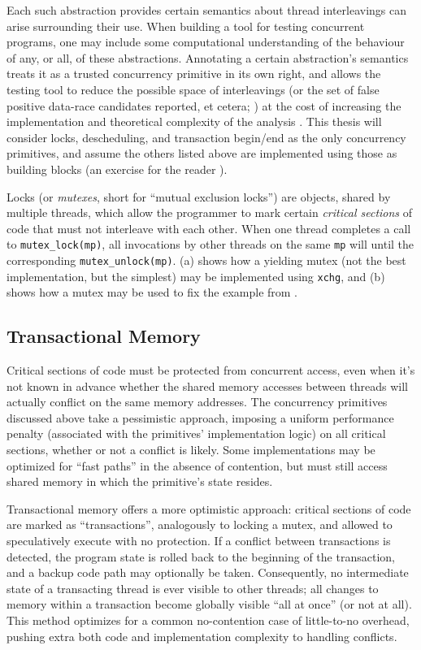Each such abstraction provides certain semantics about  thread interleavings can arise surrounding their use.
When building a tool for testing concurrent programs,
one may include some computational understanding of the behaviour of any, or all, of these abstractions.
Annotating a certain abstraction's semantics treats it as a trusted concurrency primitive in its own right,
and allows the testing tool to reduce the possible space of interleavings
(or the set of false positive data-race candidates reported, et cetera;
)
at the cost of increasing the implementation and theoretical complexity of the analysis
.
This thesis will consider locks, descheduling, and transaction begin/end as the only concurrency primitives,
and assume the others listed above are implemented using those as building blocks (an exercise for the reader \cite{thrlib}).

Locks (or {\em mutexes}, short for ``mutual exclusion locks'') are objects, shared by multiple threads, which allow the programmer to mark certain {\em critical sections} of code that must not interleave with each other.
When one thread completes a call to {\tt mutex\_lock(mp)}, all invocations by other threads on the same {\tt mp}
will  until the corresponding {\tt mutex\_unlock(mp)}.
(a) shows how a yielding mutex (not the best implementation, but the simplest) may be implemented using {\tt xchg},
and (b) shows how a mutex may be used to fix the example from .


\subsection{Transactional Memory}
\label{sec:overview-tm}

Critical sections of code must be protected from concurrent access, even when it's not known in advance whether the shared memory accesses between threads will actually conflict on the same memory addresses.
The concurrency primitives discussed above take a pessimistic approach, imposing a uniform performance penalty (associated with the primitives' implementation logic) on all critical sections, whether or not a conflict is likely.
Some implementations may be optimized for ``fast paths'' in the absence of contention, but must still access shared memory in which the primitive's state resides.

Transactional memory \cite{transactional-memory} offers a more optimistic approach: critical sections of code are marked as ``transactions'', analogously to locking a mutex, and allowed to speculatively execute with no protection.
If a conflict between transactions is detected, the program state is rolled back to the beginning of the transaction, and a backup code path may optionally be taken.
Consequently, no intermediate state of a transacting thread is ever visible to other threads; all changes to memory within a transaction become globally visible ``all at once'' (or not at all).
This method optimizes for a common no-contention case of little-to-no overhead, pushing extra both code and implementation complexity to handling conflicts.

